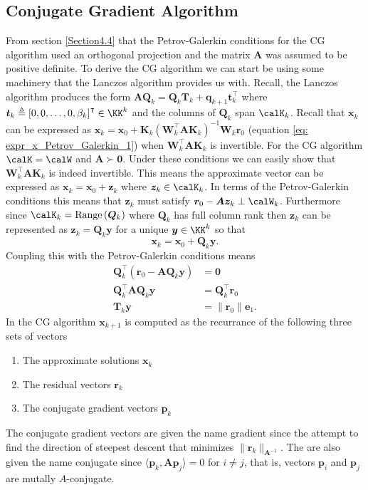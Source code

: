 \subsection{Conjugate Gradient Algorithm}\label{Section4.5}

From section \ref{Section4.4} that the Petrov-Galerkin conditions for the CG algorithm used an orthogonal projection and the matrix $\bm{A}$ was assumed to be positive definite. To derive the CG algorithm we can start be using some machinery that the Lanczos algorithm provides us with. Recall, the Lanczos algorithm produces the form $\bm{A}\bm{Q}_k = \bm{Q}_k \bm{T}_k + \bm{q}_{k+1} \bm{t}_{k}^{\intercal}$ where $\bm{t}_{k} \triangleq \left[ 0,0, \ldots , 0, \beta_k \right]^{\intercal} \in \KK^k$ and the columns of $\bm{Q}_k$ span $\calK_k$. Recall that $\bm{x}_k$ can be expressed as $\bm{x}_k = \bm{x}_0 + \bm{K}_k \left( \bm{W}_k^{\intercal} \bm{A} \bm{K}_k \right)^{-1} \bm{W}_k \bm{r}_0$ (equation \ref{eq: expr_x_Petrov_Galerkin_1}) when $\bm{W}_k^{\intercal} \bm{A} \bm{K}_k$ is invertible. For the CG algorithm $\calK = \calW$ and $\bm{A} \succ \bm{0}$. Under these conditions we can easily show that $\bm{W}_k^{\intercal} \bm{A} \bm{K}_k$ is indeed invertible. This means the approximate vector can be expressed as $\bm{x}_k = \bm{x}_0 + \bm{z}_k$ where $\bm{z}_k \in \calK_k$. In terms of the Petrov-Galerkin conditions this means that $\bm{z}_k$ must satisfy $\bm{r}_0 - \bm{A} \bm{z}_k \perp \calW_k$. Furthermore since $\calK_k = \operatorname{Range} \left( \bm{Q}_k \right)$ where $\bm{Q}_k$ has full column rank then $\bm{z}_k$ can be represented as $\bm{z}_k = \bm{Q}_k \bm{y}$ for a unique $\bm{y} \in \KK^k$ so that
\begin{equation} \label{eq: x_eq_Qky}
    \bm{x}_k = \bm{x}_0 + \bm{Q}_k \bm{y}.
\end{equation}
Coupling this with the Petrov-Galerkin conditions means
\begin{align} \label{eq: Tky_eq_normr0e1}
    \bm{Q}_k^{\intercal} \left( \bm{r}_0 - \bm{A} \bm{Q}_k \bm{y} \right) & = \bm{0}                        \nonumber \\
    \bm{Q}_k^{\intercal} \bm{A} \bm{Q}_k \bm{y}                           & = \bm{Q}_k^{\intercal} \bm{r}_0 \nonumber \\
    \bm{T}_k \bm{y}                                                       & = \| \bm{r}_0 \| \bm{e}_1.
\end{align}
In the CG algorithm $\bm{x}_{k+1}$ is computed as the recurrance of the following three sets of vectors
\begin{enumerate}
    \item The approximate solutions $\bm{x}_{k}$
    \item The residual vectors $\bm{r}_{k}$
    \item The conjugate gradient vectors $\bm{p}_k$
\end{enumerate}
The conjugate gradient vectors are given the name gradient since the attempt to find the direction of steepest descent that minimizes $\| \bm{r}_{k} \|_{\bm{A}^{-1}}$. The are also given the name conjugate since $\langle \bm{p}_k, \bm{A} \bm{p}_j \rangle = 0$ for $i \neq j$, that is, vectors $\bm{p}_i$ and $\bm{p}_j$ are mutally $A$-conjugate.

